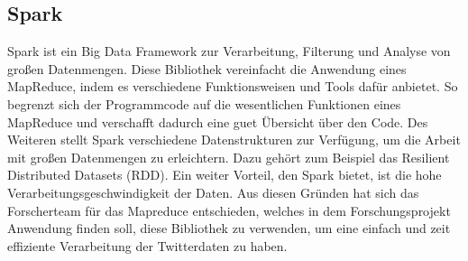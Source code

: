 	
	\subsection{Spark}
	
Spark ist ein Big Data Framework zur Verarbeitung, Filterung und Analyse von großen Datenmengen. Diese Bibliothek vereinfacht die Anwendung eines MapReduce, indem es verschiedene Funktionsweisen und Tools dafür anbietet. So begrenzt sich der Programmcode auf die wesentlichen Funktionen eines MapReduce und verschafft dadurch eine guet Übersicht über den Code. Des Weiteren stellt Spark verschiedene Datenstrukturen zur Verfügung, um die Arbeit mit großen Datenmengen zu erleichtern. Dazu gehört zum Beispiel das Resilient Distributed Datasets (RDD). Ein weiter Vorteil, den Spark bietet, ist die hohe Verarbeitungsgeschwindigkeit der Daten. Aus diesen Gründen hat sich das Forscherteam für das Mapreduce entschieden, welches in dem Forschungsprojekt Anwendung finden soll, diese Bibliothek zu verwenden, um eine einfach und zeit effiziente Verarbeitung der Twitterdaten zu haben.
	    
	

	
